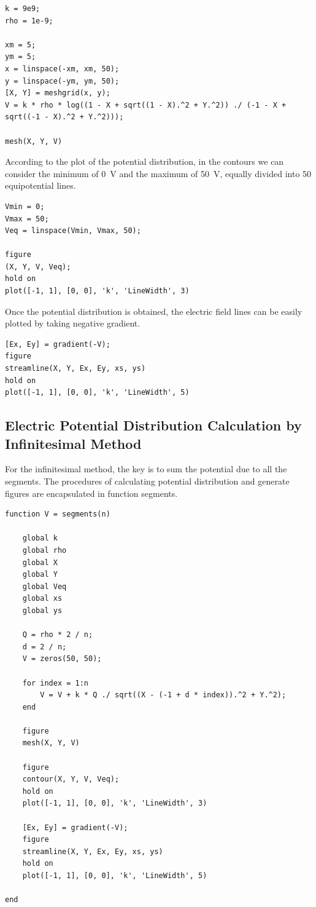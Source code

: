 \documentclass[journal]{IEEEtran}
\begin{document}
\begin{lstlisting}
k = 9e9;
rho = 1e-9;

xm = 5;
ym = 5;
x = linspace(-xm, xm, 50);
y = linspace(-ym, ym, 50);
[X, Y] = meshgrid(x, y);
V = k * rho * log((1 - X + sqrt((1 - X).^2 + Y.^2)) ./ (-1 - X + sqrt((-1 - X).^2 + Y.^2)));

mesh(X, Y, V)
\end{lstlisting}

According to the plot of the potential distribution, in the contours we can consider the minimum of \SI{0}{\volt} and the maximum of \SI{50}{\volt}, equally divided into 50 equipotential lines.

\begin{lstlisting}
Vmin = 0;
Vmax = 50;
Veq = linspace(Vmin, Vmax, 50);

figure
(X, Y, V, Veq);
hold on
plot([-1, 1], [0, 0], 'k', 'LineWidth', 3)
\end{lstlisting}

Once the potential distribution is obtained, the electric field lines can be easily plotted by taking negative gradient.

\begin{lstlisting}
[Ex, Ey] = gradient(-V);
figure
streamline(X, Y, Ex, Ey, xs, ys)
hold on
plot([-1, 1], [0, 0], 'k', 'LineWidth', 5)
\end{lstlisting}


\subsection{Electric Potential Distribution Calculation by Infinitesimal Method}

For the infinitesimal method, the key is to sum the potential due to all the segments. The procedures of calculating potential distribution and generate figures are encapsulated in function segments.

\begin{lstlisting}
function V = segments(n)

    global k
    global rho
    global X
    global Y
    global Veq
    global xs
    global ys

    Q = rho * 2 / n;
    d = 2 / n;
    V = zeros(50, 50);

    for index = 1:n
        V = V + k * Q ./ sqrt((X - (-1 + d * index)).^2 + Y.^2);
    end

    figure
    mesh(X, Y, V)

    figure
    contour(X, Y, V, Veq);
    hold on
    plot([-1, 1], [0, 0], 'k', 'LineWidth', 3)

    [Ex, Ey] = gradient(-V);
    figure
    streamline(X, Y, Ex, Ey, xs, ys)
    hold on
    plot([-1, 1], [0, 0], 'k', 'LineWidth', 5)

end
\end{lstlisting}
\end{document}
